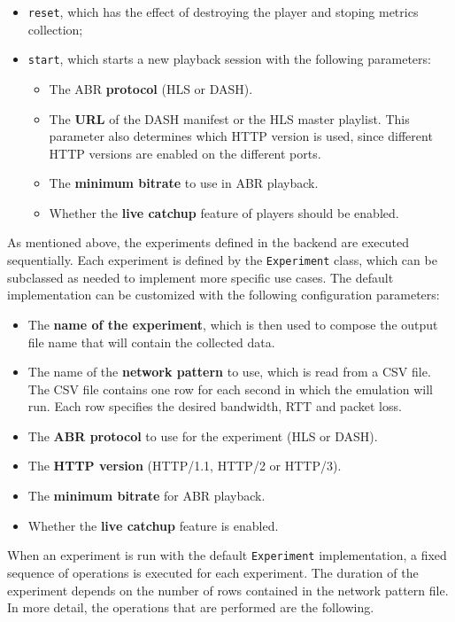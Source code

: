 \begin{itemize}
    \item \texttt{reset}, which has the effect of destroying the player and stoping metrics collection;
    \item \texttt{start}, which starts a new playback session with the following parameters:
    \begin{itemize}
        \item The ABR \textbf{protocol} (HLS or DASH).
        \item The \textbf{URL} of the DASH manifest or the HLS master playlist. This parameter also determines which HTTP version is used, since different HTTP versions are enabled on the different ports.
        \item The \textbf{minimum bitrate} to use in ABR playback.
        \item Whether the \textbf{live catchup} feature of players should be enabled.
    \end{itemize}
\end{itemize}

As mentioned above, the experiments defined in the backend are executed sequentially. Each experiment is defined by the \texttt{Experiment} class, which can be subclassed as needed to implement more specific use cases. The default implementation can be customized with the following configuration parameters:

\begin{itemize}
    \item The \textbf{name of the experiment}, which is then used to compose the output file name that will contain the collected data.
    \item The name of the \textbf{network pattern} to use, which is read from a CSV file. The CSV file contains one row for each second in which the emulation will run. Each row specifies the desired bandwidth, RTT and packet loss.
    \item The \textbf{ABR protocol} to use for the experiment (HLS or DASH).
    \item The \textbf{HTTP version} (HTTP/1.1, HTTP/2 or HTTP/3).
    \item The \textbf{minimum bitrate} for ABR playback.
    \item Whether the \textbf{live catchup} feature is enabled.
\end{itemize}

When an experiment is run with the default \texttt{Experiment} implementation, a fixed sequence of operations is executed for each experiment. The duration of the experiment depends on the number of rows contained in the network pattern file. In more detail, the operations that are performed are the following.

